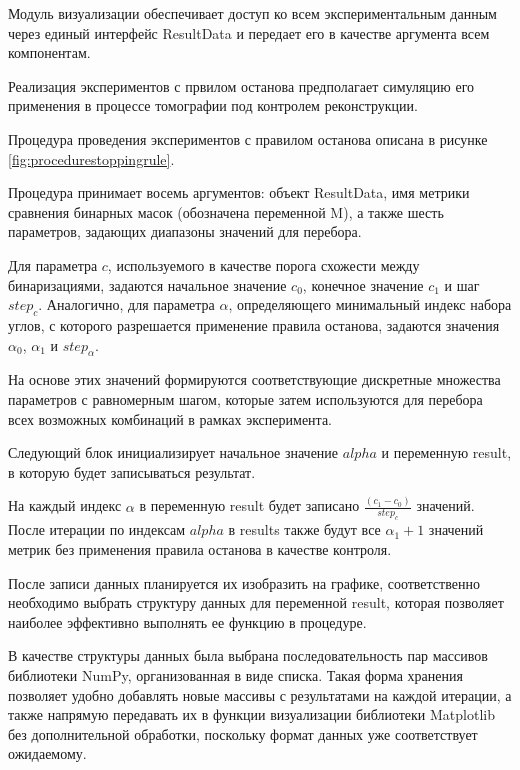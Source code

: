 Модуль визуализации обеспечивает доступ ко всем экспериментальным данным через единый интерфейс ResultData и передает его в качестве аргумента всем компонентам.

Реализация экспериментов с првилом останова предполагает симуляцию его применения в процессе томографии под контролем реконструкции.

Процедура проведения экспериментов с правилом останова описана в рисунке \ref*{fig:procedurestoppingrule}.


Процедура принимает восемь аргументов: объект ResultData, 
имя метрики сравнения бинарных масок (обозначена переменной M), 
а также шесть параметров, задающих диапазоны значений для перебора.

Для параметра \(c\), используемого в качестве порога схожести между бинаризациями, задаются начальное значение \(c_0\), конечное значение \(c_1\) и шаг \(step_c\). Аналогично, для параметра \(\alpha\), определяющего минимальный индекс набора углов, с которого разрешается применение правила останова, задаются значения \(\alpha_0\), \(\alpha_1\) и \(step_{\alpha}\).

На основе этих значений формируются соответствующие дискретные множества параметров с равномерным шагом, которые затем используются для перебора всех возможных комбинаций в рамках эксперимента.

Следующий блок инициализирует начальное значение \(alpha\) и переменную result, в которую будет записываться результат. 

На каждый индекс \(\alpha\) в переменную result будет записано \(\frac{(c_1 - c_0)}{ step_c}\) значений. После итерации по индексам \(alpha\) в results также будут все \(\alpha_1 + 1\) значений метрик без применения правила останова в качестве контроля. 

После записи данных планируется их изобразить на графике, соответственно необходимо выбрать структуру данных для переменной result, которая позволяет наиболее эффективно выполнять ее функцию в процедуре.

В качестве структуры данных была выбрана последовательность пар массивов библиотеки NumPy, организованная в виде списка. Такая форма хранения позволяет удобно добавлять новые массивы с результатами на каждой итерации, а также напрямую передавать их в функции визуализации библиотеки Matplotlib без дополнительной обработки, поскольку формат данных уже соответствует ожидаемому.

